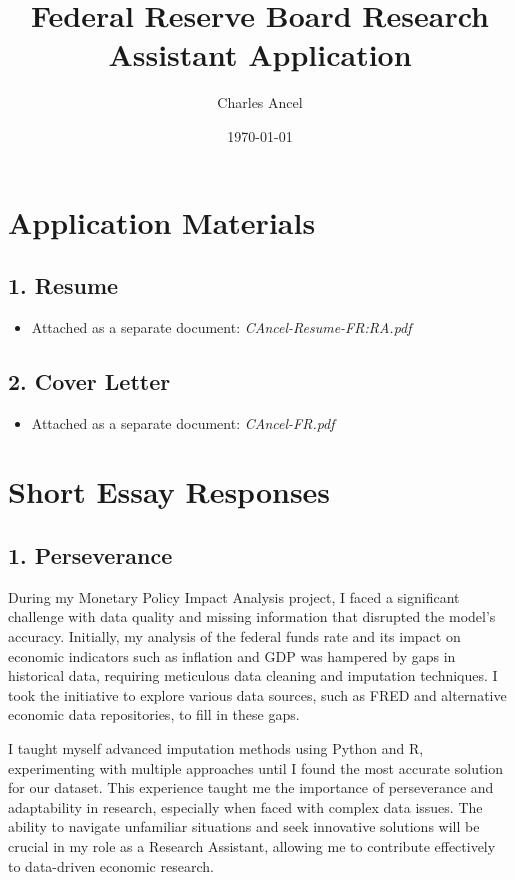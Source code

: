 \documentclass{article}
\title{Federal Reserve Board Research Assistant Application}
\author{Charles Ancel}
\date{\today}
\begin{document}
\maketitle

\section*{Application Materials}

\subsection*{1. Resume}
\begin{itemize}
    \item Attached as a separate document: \textit{CAncel-Resume-FR:RA.pdf}
\end{itemize}

\subsection*{2. Cover Letter}
\begin{itemize}
    \item Attached as a separate document: \textit{CAncel-FR.pdf}
\end{itemize}

\section*{Short Essay Responses}

\subsection*{1. Perseverance}
During my Monetary Policy Impact Analysis project, I faced a significant challenge with data quality and missing information that disrupted the model's accuracy. Initially, my analysis of the federal funds rate and its impact on economic indicators such as inflation and GDP was hampered by gaps in historical data, requiring meticulous data cleaning and imputation techniques. I took the initiative to explore various data sources, such as FRED and alternative economic data repositories, to fill in these gaps.

I taught myself advanced imputation methods using Python and R, experimenting with multiple approaches until I found the most accurate solution for our dataset. This experience taught me the importance of perseverance and adaptability in research, especially when faced with complex data issues. The ability to navigate unfamiliar situations and seek innovative solutions will be crucial in my role as a Research Assistant, allowing me to contribute effectively to data-driven economic research.
\end{document}
